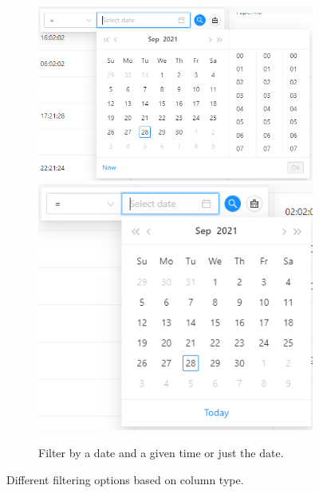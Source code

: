 \begin{figure}[!htb]
\begin{subfigure}{\linewidth}
    \centering
    \includegraphics[width=.3\linewidth]{chapters/images/ch_3/FE/Common/date_time.png}
    \includegraphics[width=.3\linewidth]{chapters/images/ch_3/FE/Common/date.png}
    \caption{Filter by a date and a given time or just the date.}
  \end{subfigure}
  \caption{Different filtering options based on column type.}
  \label{fig:filtering}
\end{figure}


